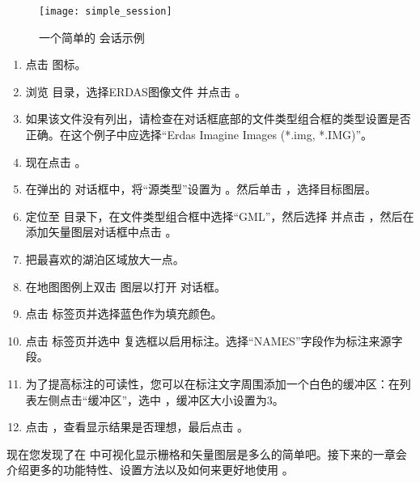 \begin{figure}[ht]
   \centering 
   \texttt{[image: simple\_session]}
   \caption{一个简单的 \qg 会话示例 \nixcaption}\label{fig:simple_session}
\end{figure}


{\setlength{\baselineskip}{1.3\baselineskip}
\begin{enumerate}[itemsep=2pt]

\item 点击  图标。 
\item 浏览  目录，选择ERDAS图像文件 并点击 。
\item 如果该文件没有列出，请检查在对话框底部的文件类型组合框的类型设置是否正确。在这个例子中应选择“Erdas Imagine Images (*.img, *.IMG)”。
\item 现在点击  。 
\item 在弹出的 对话框中，将“源类型”设置为  。然后单击  ，选择目标图层。
\item 定位至  目录下，在文件类型组合框中选择“GML”，然后选择  并点击 ，然后在添加矢量图层对话框中点击 。
\item 把最喜欢的湖泊区域放大一点。
\item 在地图图例上双击  图层以打开  对话框。
\item 点击  标签页并选择蓝色作为填充颜色。
\item 点击  标签页并选中  复选框以启用标注。选择“NAMES”字段作为标注来源字段。
\item 为了提高标注的可读性，您可以在标注文字周围添加一个白色的缓冲区：在列表左侧点击“缓冲区”，选中  ，缓冲区大小设置为3。
\item 点击 ，查看显示结果是否理想，最后点击 。
\end{enumerate} 
\par}
现在您发现了在 \qg 中可视化显示栅格和矢量图层是多么的简单吧。接下来的一章会介绍更多的功能特性、设置方法以及如何来更好地使用 \qg 。

\FloatBarrier
